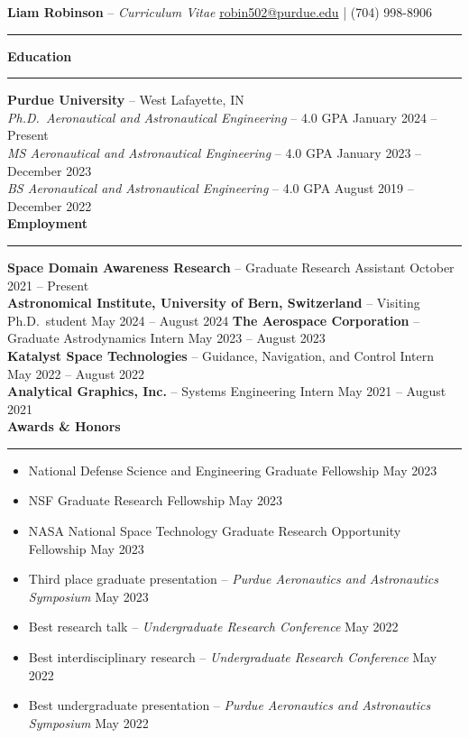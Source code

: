 \documentclass[11pt, a4paper]{article}
\newcommand{\github}[1]{%
   \href{#1}{\faGithub}%
}
\newcommand{\yt}[1]{%
   \href{#1}{\faYoutube}%
}
\newcommand{\sectiontitle}[1]{{\Large \textbf{#1}}\vspace{0.5em}\hrule\vspace{0.5em}}
\begin{document}
\thispagestyle{empty}

\sffamily

\noindent
\textbf{\huge Liam Robinson} \github{https://github.com/ljrobins} \yt{https://www.youtube.com/channel/UCqM4avrjDiO7ji1Q2nn7vKQ} -- \textit{\huge Curriculum Vitae} \hfill \href{mailto:robin502@purdue.edu}{robin502@purdue.edu} | (704) 998-8906
\rule{\linewidth}{4pt}
\vspace{-0.5em}

\sectiontitle{Education}
\textbf{Purdue University} -- West Lafayette, IN \\
\textit{Ph.D.\ Aeronautical and Astronautical Engineering} -- 4.0 GPA \hfill January 2024 -- Present \\
\textit{MS Aeronautical and Astronautical Engineering} -- 4.0 GPA \hfill January 2023 -- December 2023 \\
\textit{BS Aeronautical and Astronautical Engineering} -- 4.0 GPA \hfill August 2019 -- December 2022 \\

\sectiontitle{Employment}
\textbf{Space Domain Awareness Research} -- Graduate Research Assistant \hfill October 2021 -- Present \\
\textbf{Astronomical Institute, University of Bern, Switzerland} -- Visiting Ph.D.\ student \hfill May 2024 -- August 2024
\textbf{The Aerospace Corporation} -- Graduate Astrodynamics Intern \hfill May 2023 -- August 2023 \\
\textbf{Katalyst Space Technologies} -- Guidance, Navigation, and Control Intern \hfill May 2022 -- August 2022 \\
\textbf{Analytical Graphics, Inc.} -- Systems Engineering Intern \hfill May 2021 -- August 2021 \\


\sectiontitle{Awards \& Honors}
\begin{itemize}[noitemsep]
    \item National Defense Science and Engineering Graduate Fellowship \hfill May 2023
    \item NSF Graduate Research Fellowship \hfill May 2023
    \item NASA National Space Technology Graduate Research Opportunity Fellowship \hfill May 2023
    \item Third place graduate presentation -- \textit{Purdue Aeronautics and Astronautics Symposium} \hfill May 2023
    \item Best research talk -- \textit{Undergraduate Research Conference} \hfill May 2022
    \item Best interdisciplinary research -- \textit{Undergraduate Research Conference} \hfill May 2022
    \item Best undergraduate presentation -- \textit{Purdue Aeronautics and Astronautics Symposium} \hfill May 2022
\end{itemize}
\end{document}
